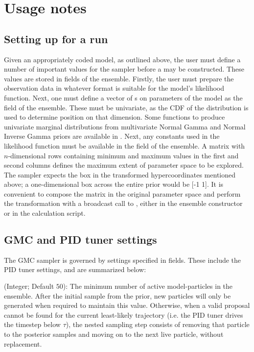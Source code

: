 \section{Usage notes}
\subsection{Setting up for a run}
Given an appropriately coded model, as outlined above, the user must define a number of important values for the sampler before a  may be constructed. These values are stored in fields of the ensemble. Firstly, the user must prepare the observation data in whatever format is suitable for the model's likelihood function. Next, one must define a vector of s on parameters of the model as the  field of the ensemble. These must be univariate, as the CDF of the distribution is used to determine position on that dimension. Some functions to produce univariate marginal distributions from multivariate Normal Gamma and Normal Inverse Gamma priors are available in . Next, any constants used in the likelihood function must be available in the  field of the ensemble. A  matrix with $n$-dimensional rows containing minimum and maximum values in the first and second columns defines the maximum extent of parameter space to be explored. The sampler expects the box in the transformed hypercoordinates mentioned above; a one-dimensional box across the entire prior would be [-1 1]. It is convenient to compose the matrix in the original parameter space and perform the transformation with a broadcast call to , either in the ensemble constructor or in the calculation script.

\subsection{GMC and PID tuner settings}
The GMC sampler is governed by settings specified in  fields. These include the PID tuner settings, and are summarized below:

 (Integer; Default $50$): The minimum number of active model-particles in the ensemble. After the initial sample from the prior, new particles will only be generated when required to maintain this value. Otherwise, when a valid proposal cannot be found for the current least-likely trajectory (i.e. the PID tuner drives the timestep below $\tau$), the nested sampling step consists of removing that particle to the posterior samples and moving on to the next live particle, without replacement. 

